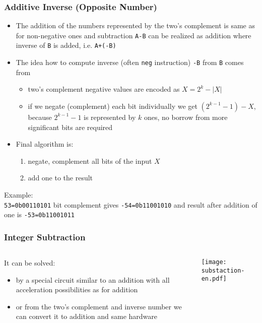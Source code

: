 \documentclass{beamer}
\begin{document}
\begin{frame}
\frametitle{Additive Inverse (Opposite Number)}
\begin{itemize}
\item The addition of the numbers represented by the two's complement is same as for non-negative ones and subtraction \texttt{A-B} can be realized as addition where inverse of \texttt{B} is added, i.e. \texttt{A+(-B)}
\item The idea how to compute inverse (often \texttt{neg} instruction) \texttt{-B} from \texttt{B} comes from
\begin{itemize}
\item two's complement negative values are encoded as $X = 2^k-|X|$
\item if we negate (complement) each bit individually we get $(2^{k-1}-1)-X$, because $2^{k-1}-1$ is represented by $k$ ones, no borrow from more significant bits are required
\end{itemize}
\item Final algorithm is:
\begin{enumerate}
\item negate, complement all bits of the input $X$
\item add one to the result
\end{enumerate}
\end{itemize}

Example:\\
\texttt{53=0b00110101} bit complement gives \texttt{-54=0b11001010} and result after addition of one is \texttt{-53=0b11001011}

\end{frame}


\begin{frame}
\frametitle{Integer Subtraction}


\begin{columns}
\begin{column}{0.5\textwidth}
It can be solved:
\begin{itemize}
\item by a special circuit similar to an addition with all acceleration possibilities as for addition
\item or from the two's complement and inverse number we can convert it to addition and same hardware
\end{itemize}
\end{column}
\hfill
\begin{column}{0.5\textwidth}
\begin{center}
\texttt{[image: substaction-en.pdf]}
\end{center}
\end{column}
\end{columns}


\end{frame}
\end{document}
